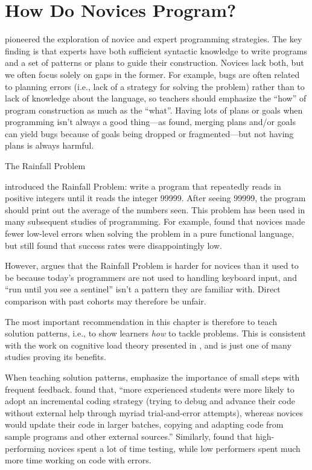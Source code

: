 \section{How Do Novices Program?}\label{s:pck-programming}

\cite{Solo1984,Solo1986} pioneered the exploration of novice and
expert programming strategies.  The key finding is that experts have
both sufficient syntactic knowledge to write programs and a set of
patterns or plans to guide their construction.  Novices lack both, but
we often focus solely on gaps in the former.  For example, bugs are
often related to planning errors (i.e., lack of a strategy for solving
the problem) rather than to lack of knowledge about the language, so
teachers should emphasize the ``how'' of program construction as much
as the ``what''.  Having lots of plans or goals when programming isn't
always a good thing---as \cite{Spoh1985} found, merging plans and/or
goals can yield bugs because of goals being dropped or
fragmented---but not having plans is always harmful.

\begin{callout}{The Rainfall Problem}

  \cite{Solo1986} introduced the Rainfall Problem: write a program
  that repeatedly reads in positive integers until it reads the
  integer 99999. After seeing 99999, the program should print out the
  average of the numbers seen.  This problem has been used in many
  subsequent studies of programming.  For example, \cite{Fisl2014}
  found that novices made fewer low-level errors when solving the
  problem in a pure functional language, but \cite{Sepp2015} still
  found that success rates were disappointingly low.

  However, \cite{Simo2013} argues that the Rainfall Problem is harder
  for novices than it used to be because today's programmers are not
  used to handling keyboard input, and ``run until you see a
  sentinel'' isn't a pattern they are familiar with.  Direct
  comparison with past cohorts may therefore be unfair.

\end{callout}

The most important recommendation in this chapter is therefore to
teach solution patterns, i.e., to show learners \emph{how} to tackle
problems. This is consistent with the work on cognitive load theory
presented in , and \cite{Mull2007b} is just one of
many studies proving its benefits.

When teaching solution patterns, emphasize the importance of small
steps with frequent feedback. \cite{Blik2014} found that, ``more
experienced students were more likely to adopt an incremental coding
strategy (trying to debug and advance their code without external help
through myriad trial-and-error attempts), whereas novices would update
their code in larger batches, copying and adapting code from sample
programs and other external sources.''  Similarly, \cite{Cart2017}
found that high-performing novices spent a lot of time testing, while
low performers spent much more time working on code with errors.


